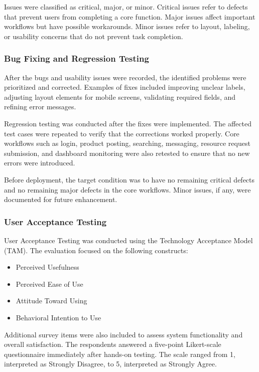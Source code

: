 Issues were classified as critical, major, or minor. Critical issues refer to defects that prevent users from completing a core function. Major issues affect important workflows but have possible workarounds. Minor issues refer to layout, labeling, or usability concerns that do not prevent task completion.

\subsubsection{Bug Fixing and Regression Testing}

After the bugs and usability issues were recorded, the identified problems were prioritized and corrected. Examples of fixes included improving unclear labels, adjusting layout elements for mobile screens, validating required fields, and refining error messages.

Regression testing was conducted after the fixes were implemented. The affected test cases were repeated to verify that the corrections worked properly. Core workflows such as login, product posting, searching, messaging, resource request submission, and dashboard monitoring were also retested to ensure that no new errors were introduced.

Before deployment, the target condition was to have no remaining critical defects and no remaining major defects in the core workflows. Minor issues, if any, were documented for future enhancement.

\subsubsection{User Acceptance Testing}

User Acceptance Testing was conducted using the Technology Acceptance Model (TAM). The evaluation focused on the following constructs:

\begin{itemize}
    \item Perceived Usefulness
    \item Perceived Ease of Use
    \item Attitude Toward Using
    \item Behavioral Intention to Use
\end{itemize}

Additional survey items were also included to assess system functionality and overall satisfaction. The respondents answered a five-point Likert-scale questionnaire immediately after hands-on testing. The scale ranged from 1, interpreted as Strongly Disagree, to 5, interpreted as Strongly Agree.

